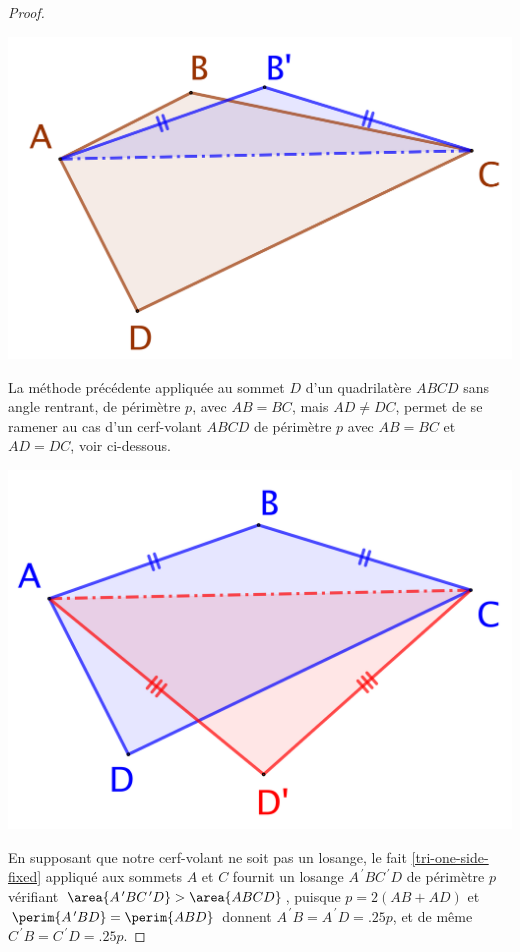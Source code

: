 \begin{proof}
	\begin{center}
		\includegraphics[scale=.4]{content/quadrilateral/convex-gene.png}
	\end{center}
	
	
	La méthode précédente appliquée au sommet $D$ d'un quadrilatère $ABCD$ sans angle rentrant, de périmètre $p$, avec $AB = BC$, mais $AD \neq DC$, permet de se ramener au cas d'un cerf-volant $ABCD$ de périmètre $p$ avec $AB = BC$ et $AD = DC$, voir ci-dessous. 

	\begin{center}
		\includegraphics[scale=.4]{content/quadrilateral/convex-one-paire.png}
	\end{center}
	
	
	En supposant que notre cerf-volant ne soit pas un losange, le fait \ref{tri-one-side-fixed} appliqué aux sommets $A$ et $C$ fournit un losange $A^{\,\prime}BC^{\,\prime}D$ de périmètre $p$ vérifiant $\area{A^{\,\prime}BC^{\,\prime}D} > \area{ABCD}$, 
	puisque
	$p = 2(AB + AD)$
	et
	$\perim{A^{\,\prime}BD} = \perim{ABD}$
	donnent
	$A^{\,\prime}B = A^{\,\prime}D = \num{.25} p$,
	et de même
	$C^{\,\prime}B = C^{\,\prime}D = \num{.25} p$.


\end{proof}
